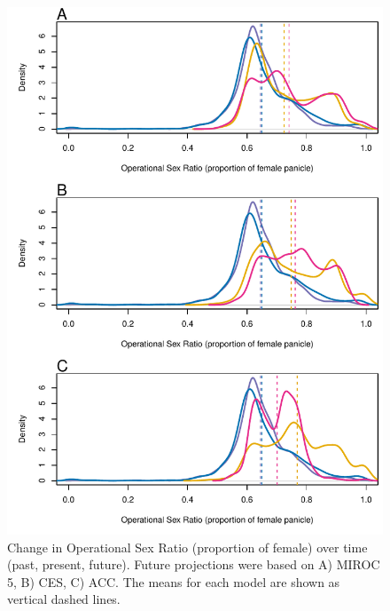 \documentclass[12pt]{article}\usepackage[]{graphicx}\usepackage[dvipsnames]{xcolor}
\begin{document}

\begin{figure}[H]
  \begin{center}
    \includegraphics[width=0.80\linewidth]{Figures/POAR_OSR_MIROC_CES_ACC.pdf}
  \caption{Change in Operational Sex Ratio (proportion of female) over time (past, present, future).
  Future projections were based on A) MIROC 5, B) CES, C) ACC.
  The means for each model are shown as vertical dashed lines.}
  \label{Sup:osrall}
  \end{center}
\end{figure}
\end{document}
